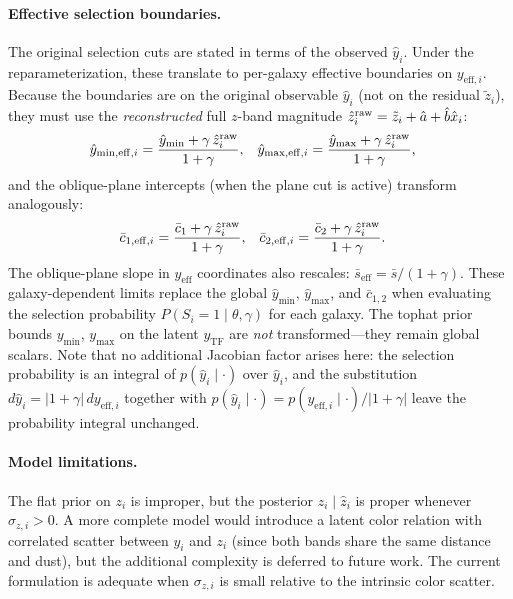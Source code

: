 \paragraph{Effective selection boundaries.}
The original selection cuts are stated in terms of the observed $\hat{y}_i$.
Under the reparameterization, these translate to per-galaxy effective
boundaries on $y_{\mathrm{eff},i}$.
Because the boundaries are on the original observable $\hat{y}_i$ (not on the
residual $\tilde{z}_i$), they must use the \emph{reconstructed} full $z$-band
magnitude $\hat{z}_i^{\rm raw} = \tilde{z}_i + \hat{a} + \hat{b}\hat{x}_i$:
\begin{align}
\hat{y}_{\min,\mathrm{eff},i} &= \frac{\hat{y}_{\min} + \gamma\,\hat{z}_i^{\rm raw}}{1+\gamma}, &
\hat{y}_{\max,\mathrm{eff},i} &= \frac{\hat{y}_{\max} + \gamma\,\hat{z}_i^{\rm raw}}{1+\gamma},
\label{eq:color:bounds}
\end{align}
and the oblique-plane intercepts (when the plane cut is active) transform analogously:
\begin{align}
\bar{c}_{1,\mathrm{eff},i} &= \frac{\bar{c}_1 + \gamma\,\hat{z}_i^{\rm raw}}{1+\gamma}, &
\bar{c}_{2,\mathrm{eff},i} &= \frac{\bar{c}_2 + \gamma\,\hat{z}_i^{\rm raw}}{1+\gamma}.
\label{eq:color:plane_bounds}
\end{align}
The oblique-plane slope in $y_{\mathrm{eff}}$ coordinates also rescales:
$\bar{s}_{\mathrm{eff}} = \bar{s}/(1+\gamma)$.
These galaxy-dependent limits replace the global $\hat{y}_{\min}$, $\hat{y}_{\max}$,
and $\bar{c}_{1,2}$ when evaluating the selection probability
$P(S_i=1\mid\theta,\gamma)$ for each galaxy.
The tophat prior bounds $y_{\min}$, $y_{\max}$ on the latent $y_{\mathrm{TF}}$
are \emph{not} transformed---they remain global scalars.
Note that no additional Jacobian factor arises here: the selection probability
is an integral of $p(\hat{y}_i\mid\cdot)$ over $\hat{y}_i$, and the substitution
$d\hat{y}_i = |1+\gamma|\,dy_{\mathrm{eff},i}$ together with
$p(\hat{y}_i\mid\cdot) = p(y_{\mathrm{eff},i}\mid\cdot)/|1+\gamma|$
leave the probability integral unchanged.

\paragraph{Model limitations.}
The flat prior on $z_i$ is improper, but the posterior $z_i\mid\hat{z}_i$ is proper
whenever $\sigma_{z,i}>0$.
A more complete model would introduce a latent color relation
with correlated scatter between $y_i$ and $z_i$ (since both bands share
the same distance and dust), but the additional complexity is deferred to future work.
The current formulation is adequate when $\sigma_{z,i}$ is small relative to the
intrinsic color scatter.



